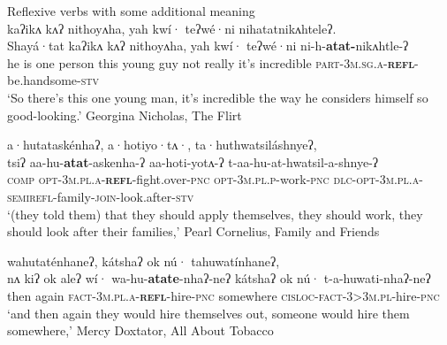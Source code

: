 \documentclass[output=paper]{langscibook}
\begin{document}

\ea%
     Reflexive verbs with some additional meaning \\
    \label{ex:oneida:15}
    \ea \label{ex:oneida:15a}
     {kaʔikʌ} {kʌʔ} {nithoyʌha,} {yah} {kwí·} {teʔwé·ni}      {nihatatnikʌhteleʔ.}   \\ 
     Shayá·tat kaʔikʌ kʌʔ nithoyʌha, yah   kwí· teʔwé·ni ni-h-\textbf{atat-}nikʌhtle-ʔ\\
    {he is one person}  this {young guy}  not  really    {it’s incredible} \textsc{part-3m.sg.a-}\textbf{\textsc{refl}}\textsc{-}be.handsome\textsc{-stv}  \\
  \glt ‘So there’s this one young man, it’s incredible the way he considers himself so good-looking.’ Georgina Nicholas, {The} {Flirt}
    
\ex 
     \label{ex:oneida:15b}
   {a·hutataskénhaʔ,} {a·hotiyo·tʌ·,} {ta·huthwatsiláshnyeʔ,}\\
   tsiʔ aa-hu-\textbf{atat}{}-askenha-ʔ aa-hoti-yotʌ-ʔ t-aa-hu-at-hwatsil-a-shnye-ʔ\\
  \textsc{comp}    \textsc{opt-3m.pl.a-}\textbf{\textsc{refl}}\textsc{-}fight.over\textsc{-pnc}  \textsc{opt-3m.pl.p-}work\textsc{-pnc} \textsc{dlc-opt-3m.pl.a-semirefl-}family-\textsc{join}{}-look.after-\textsc{stv}  \\
  \glt ‘(they told them) that they should apply themselves, they should work, they should       look after their families,’ Pearl Cornelius, {Family} {and} {Friends}
    
\ex   \label{ex:oneida:15c}
     {wahutaténhaneʔ,} {{kátshaʔ} {ok} {nú·}}   {tahuwatínhaneʔ,}\\
   {nʌ kiʔ ok aleʔ wí·} wa-hu-\textbf{atate}{}-nhaʔ-neʔ {{kátshaʔ} {ok} nú·} t-a-huwati-nhaʔ-neʔ\\
    {then again} \textsc{fact-3m.pl.a-}\textbf{\textsc{refl}}\textsc{-}hire\textsc{-pnc} somewhere    \textsc{cisloc-fact-3>3m.pl-}hire-\textsc{pnc}\\
  \glt ‘and then again they would hire themselves out, someone would hire them somewhere,’ Mercy Doxtator, {All} {About} {Tobacco}
    
\end{document}
